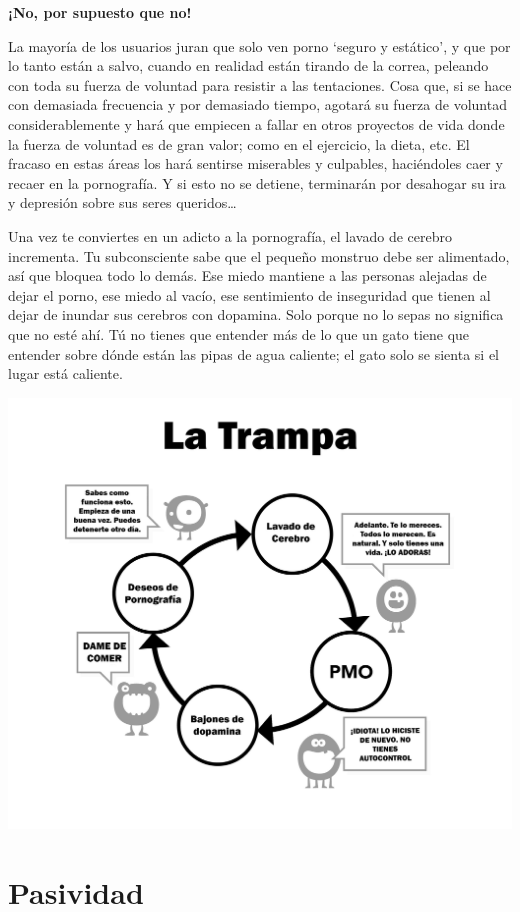\documentclass[
  spanish,
  openany]{book}
\begin{document}
\textbf{¡No, por supuesto que no!}

La mayoría de los usuarios juran que solo ven porno `seguro y estático', y que por lo tanto están a salvo, cuando en realidad están tirando de la correa, peleando con toda su fuerza de voluntad para resistir a las tentaciones. Cosa que, si se hace con demasiada frecuencia y por demasiado tiempo, agotará su fuerza de voluntad considerablemente y hará que empiecen a fallar en otros proyectos de vida donde la fuerza de voluntad es de gran valor; como en el ejercicio, la dieta, etc. El fracaso en estas áreas los hará sentirse miserables y culpables, haciéndoles caer y recaer en la pornografía. Y si esto no se detiene, terminarán por desahogar su ira y depresión sobre sus seres queridos\ldots{}

Una vez te conviertes en un adicto a la pornografía, el lavado de cerebro incrementa. Tu subconsciente sabe que el pequeño monstruo debe ser alimentado, así que bloquea todo lo demás. Ese miedo mantiene a las personas alejadas de dejar el porno, ese miedo al vacío, ese sentimiento de inseguridad que tienen al dejar de inundar sus cerebros con dopamina. Solo porque no lo sepas no significa que no esté ahí. Tú no tienes que entender más de lo que un gato tiene que entender sobre dónde están las pipas de agua caliente; el gato solo se sienta si el lugar está caliente.

\includegraphics{LA TRAMPA.jpg}\\

\hypertarget{pasividad}{%
\section{Pasividad}\label{pasividad}}
\end{document}
